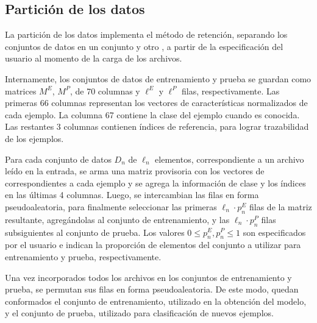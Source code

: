 %
%
%
\subsection{Partición de los datos}
%
La partición de los datos implementa el método de retención, separando
los conjuntos de datos en un conjunto  y otro
, a partir de la especificación del usuario al momento de
la carga de los archivos.

Internamente, los conjuntos de datos de entrenamiento y prueba se
guardan como matrices $M^E$, $M^P$, de 70 columnas y $\ell^E$ y
$\ell^P$ filas, respectivamente.
Las primeras 66 columnas representan los vectores de características
normalizados de cada ejemplo. La columna 67 contiene la clase del
ejemplo cuando es conocida. Las restantes 3 columnas contienen índices
de referencia, para lograr trazabilidad de los ejemplos.

Para cada conjunto de datos $D_n$ de $\ell_n$ elementos,
correspondiente a un archivo leído en la entrada, se arma una matriz
provisoria con los vectores de  correspondientes a cada
ejemplo y se agrega la información de clase y los índices en las
últimas 4 columnas. Luego, se intercambian las filas en forma
pseudoaleatoria, para finalmente seleccionar las primeras
$\ell_n\cdot{}p_n^E$ filas de la matriz resultante, agregándolas al
conjunto de entrenamiento, y las $\ell_n\cdot{}p_n^P$ filas
subsiguientes al conjunto de prueba. Los valores
$0\leq{}p_n^E,p_n^P\leq1$ son especificados por el usuario e indican
la proporción de elementos del conjunto a utilizar para entrenamiento
y prueba, respectivamente.

Una vez incorporados todos los archivos en los conjuntos de
entrenamiento y prueba, se permutan sus filas en forma
pseudoaleatoria. De este modo, quedan conformados el conjunto de
entrenamiento, utilizado en la obtención del modelo, y el conjunto de
prueba, utilizado para clasificación de nuevos ejemplos.



